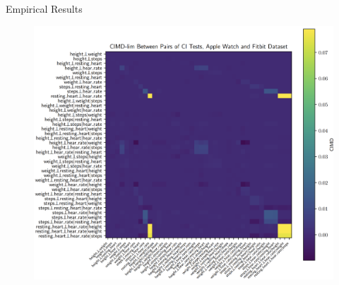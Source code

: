 \documentclass{beamer}
\begin{document}
\begin{frame}{Empirical Results}
	\begin{figure}
		\includegraphics[scale=0.12]{imgs/empirical2.png}
	\end{figure}
\end{frame}
\end{document}
